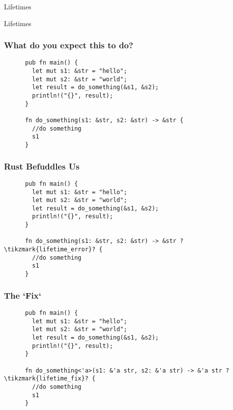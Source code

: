 \begin{section}{Lifetimes}

  \begin{frame}
    \centerline{
      \huge{Lifetimes}
    }
  \end{frame}

  \begin{frame}[fragile]
    \frametitle{What do you expect this to do? \cite{RustLang}}
    \begin{verbatim}
      pub fn main() {
        let mut s1: &str = "hello";
        let mut s2: &str = "world";
        let result = do_something(&s1, &s2);
        println!("{}", result);
      }

      fn do_something(s1: &str, s2: &str) -> &str {
        //do something
        s1
      }
    \end{verbatim}
  \end{frame}


  \begin{frame}[fragile]
    \frametitle{Rust Befuddles Us}
    \begin{verbatim}
      pub fn main() {
        let mut s1: &str = "hello";
        let mut s2: &str = "world";
        let result = do_something(&s1, &s2);
        println!("{}", result);
      }

      fn do_something(s1: &str, s2: &str) -> &str ?\tikzmark{lifetime_error}? {
        //do something
        s1
      }
    \end{verbatim}
  \end{frame}

  \begin{frame}[fragile]
    \frametitle{The `Fix`}
    \begin{verbatim}
      pub fn main() {
        let mut s1: &str = "hello";
        let mut s2: &str = "world";
        let result = do_something(&s1, &s2);
        println!("{}", result);
      }

      fn do_something<'a>(s1: &'a str, s2: &'a str) -> &'a str ?\tikzmark{lifetime_fix}? {
        //do something
        s1
      }
    \end{verbatim}
  \end{frame}


\end{section}
